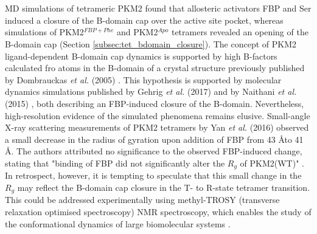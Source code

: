 %
%
\\\\
%
%
MD simulations of tetrameric PKM2 found that allosteric activators FBP and Ser induced a closure of the B-domain cap over the active site pocket, whereas simulations of PKM2$^{FBP+Phe}$ and PKM2$^{Apo}$ tetramers revealed an opening of the B-domain cap (Section \ref{subsec:tet_bdomain_closure}). The concept of PKM2 ligand-dependent B-domain cap dynamics is supported by high B-factors calculated fro atoms in the B-domain of a crystal structure previously published by Dombrauckas \textit{et al.} (2005) \cite{Dombrauckas:2005aa}. This hypothesis is supported by molecular dynamics simulations published by Gehrig \textit{et al.} (2017) \cite{Gehrig:2017aa} and by Naithani \textit{et al.} (2015) \cite{Naithani:2015aa}, both describing an FBP-induced closure of the B-domain. Nevertheless, high-resolution evidence of the simulated phenomena remains elusive. Small-angle X-ray scattering measurements of PKM2 tetramers by Yan \textit{et al.} (2016) \cite{Yan:2016aa} observed a small decrease in the radius of gyration upon addition of FBP from 43 \AA to 41 \AA . The authors attributed no significance to the observed FBP-induced change, stating that "binding of FBP did not significantly alter the $R_{g}$ of PKM2(WT)" \cite{Yan:2016aa}. In retrospect, however, it is tempting to speculate that this small change in the $R_{g}$ may reflect the B-domain cap closure in the T- to R-state tetramer transition. This could be addressed experimentally using methyl-TROSY (transverse relaxation optimised spectroscopy) NMR spectroscopy, which enables the study of the conformational dynamics of large biomolecular systems \cite{Rosenzweig:2014aa}. 

\clearpage


